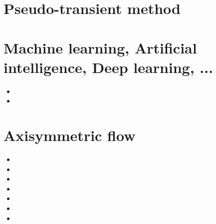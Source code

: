 

\section{Pseudo-transient method}


\section{Machine learning, Artificial intelligence, Deep learning, ...}

\begin{scriptsize}
\begin{itemize}
\item[\twothousandtwentyone] 
\item[\twothousandtwentythree] 
\end{itemize}
\end{scriptsize}

\section{Axisymmetric flow}

\begin{scriptsize}
\begin{itemize}
\item[\nineteenninetytwo] 
\item[\nineteenninetyseven] 
\item[\twothousandthree] 
\item[\twothousandfour] 
\item[\twothousandseven] 
\item[\twothousandten] 
\item[\twothousandtwelve] 
\end{itemize}
\end{scriptsize}


